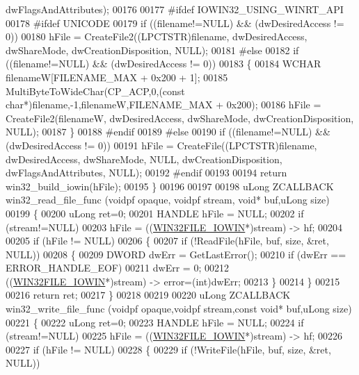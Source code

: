 \begin{DoxyCode}
      dwFlagsAndAttributes);
00176 
00177 \textcolor{preprocessor}{#ifdef IOWIN32\_USING\_WINRT\_API}
00178 \textcolor{preprocessor}{#ifdef UNICODE}
00179     \textcolor{keywordflow}{if} ((filename!=NULL) && (dwDesiredAccess != 0))
00180         hFile = CreateFile2((LPCTSTR)filename, dwDesiredAccess, dwShareMode, dwCreationDisposition, NULL);
00181 \textcolor{preprocessor}{#else}
00182     \textcolor{keywordflow}{if} ((filename!=NULL) && (dwDesiredAccess != 0))
00183     \{
00184         WCHAR filenameW[FILENAME\_MAX + 0x200 + 1];
00185         MultiByteToWideChar(CP\_ACP,0,(\textcolor{keyword}{const} \textcolor{keywordtype}{char}*)filename,-1,filenameW,FILENAME\_MAX + 0x200);
00186         hFile = CreateFile2(filenameW, dwDesiredAccess, dwShareMode, dwCreationDisposition, NULL);
00187     \}
00188 \textcolor{preprocessor}{#endif}
00189 \textcolor{preprocessor}{#else}
00190     \textcolor{keywordflow}{if} ((filename!=NULL) && (dwDesiredAccess != 0))
00191         hFile = CreateFile((LPCTSTR)filename, dwDesiredAccess, dwShareMode, NULL, dwCreationDisposition, 
      dwFlagsAndAttributes, NULL);
00192 \textcolor{preprocessor}{#endif}
00193 
00194     \textcolor{keywordflow}{return} win32\_build\_iowin(hFile);
00195 \}
00196 
00197 
00198 uLong ZCALLBACK win32\_read\_file\_func (voidpf opaque, voidpf stream, \textcolor{keywordtype}{void}* buf,uLong size)
00199 \{
00200     uLong ret=0;
00201     HANDLE hFile = NULL;
00202     \textcolor{keywordflow}{if} (stream!=NULL)
00203         hFile = ((\hyperlink{struct_w_i_n32_f_i_l_e___i_o_w_i_n}{WIN32FILE\_IOWIN}*)stream) -> hf;
00204 
00205     \textcolor{keywordflow}{if} (hFile != NULL)
00206     \{
00207         \textcolor{keywordflow}{if} (!ReadFile(hFile, buf, size, &ret, NULL))
00208         \{
00209             DWORD dwErr = GetLastError();
00210             \textcolor{keywordflow}{if} (dwErr == ERROR\_HANDLE\_EOF)
00211                 dwErr = 0;
00212             ((\hyperlink{struct_w_i_n32_f_i_l_e___i_o_w_i_n}{WIN32FILE\_IOWIN}*)stream) -> error=(int)dwErr;
00213         \}
00214     \}
00215 
00216     \textcolor{keywordflow}{return} ret;
00217 \}
00218 
00219 
00220 uLong ZCALLBACK win32\_write\_file\_func (voidpf opaque,voidpf stream,\textcolor{keyword}{const} \textcolor{keywordtype}{void}* buf,uLong size)
00221 \{
00222     uLong ret=0;
00223     HANDLE hFile = NULL;
00224     \textcolor{keywordflow}{if} (stream!=NULL)
00225         hFile = ((\hyperlink{struct_w_i_n32_f_i_l_e___i_o_w_i_n}{WIN32FILE\_IOWIN}*)stream) -> hf;
00226 
00227     \textcolor{keywordflow}{if} (hFile != NULL)
00228     \{
00229         \textcolor{keywordflow}{if} (!WriteFile(hFile, buf, size, &ret, NULL))

\end{DoxyCode}
